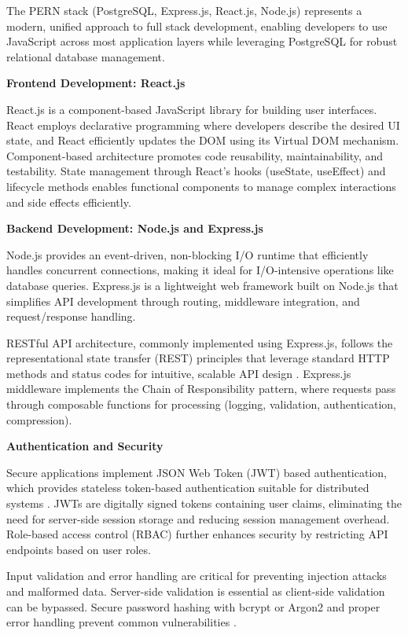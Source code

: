 The PERN stack (PostgreSQL, Express.js, React.js, Node.js) represents a modern, unified approach to full stack development, enabling developers to use JavaScript across most application layers while leveraging PostgreSQL for robust relational database management.

\textbf{Frontend Development: React.js}

React.js is a component-based JavaScript library for building user interfaces. React employs declarative programming where developers describe the desired UI state, and React efficiently updates the DOM using its Virtual DOM mechanism. Component-based architecture promotes code reusability, maintainability, and testability. State management through React's hooks (useState, useEffect) and lifecycle methods enables functional components to manage complex interactions and side effects efficiently.

\textbf{Backend Development: Node.js and Express.js}

Node.js provides an event-driven, non-blocking I/O runtime that efficiently handles concurrent connections, making it ideal for I/O-intensive operations like database queries. Express.js is a lightweight web framework built on Node.js that simplifies API development through routing, middleware integration, and request/response handling. 

RESTful API architecture, commonly implemented using Express.js, follows the representational state transfer (REST) principles that leverage standard HTTP methods and status codes for intuitive, scalable API design \parencite{Fielding2000}. Express.js middleware implements the Chain of Responsibility pattern, where requests pass through composable functions for processing (logging, validation, authentication, compression).

\textbf{Authentication and Security}

Secure applications implement JSON Web Token (JWT) based authentication, which provides stateless token-based authentication suitable for distributed systems \parencite{Jones2015}. JWTs are digitally signed tokens containing user claims, eliminating the need for server-side session storage and reducing session management overhead. Role-based access control (RBAC) further enhances security by restricting API endpoints based on user roles.

Input validation and error handling are critical for preventing injection attacks and malformed data. Server-side validation is essential as client-side validation can be bypassed. Secure password hashing with bcrypt or Argon2 and proper error handling prevent common vulnerabilities \parencite{McGraw2006}.

